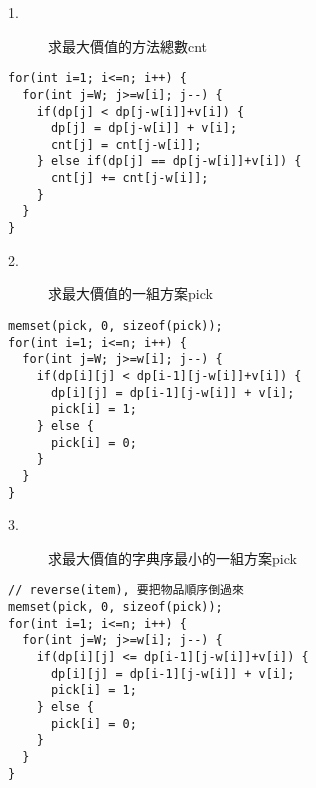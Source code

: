 \begin{center}
  \underline{  \bf{}  }
\end{center}

\begin{description}
  \item[1.] 求最大價值的方法總數cnt
\end{description}
\begin{lstlisting}
for(int i=1; i<=n; i++) {
  for(int j=W; j>=w[i]; j--) {
    if(dp[j] < dp[j-w[i]]+v[i]) {
      dp[j] = dp[j-w[i]] + v[i];
      cnt[j] = cnt[j-w[i]];
    } else if(dp[j] == dp[j-w[i]]+v[i]) {
      cnt[j] += cnt[j-w[i]];
    }
  }
}
\end{lstlisting}

\begin{description}
  \item[2.] 求最大價值的一組方案pick
\end{description}
\begin{lstlisting}
memset(pick, 0, sizeof(pick));
for(int i=1; i<=n; i++) {
  for(int j=W; j>=w[i]; j--) {
    if(dp[i][j] < dp[i-1][j-w[i]]+v[i]) {
      dp[i][j] = dp[i-1][j-w[i]] + v[i];
      pick[i] = 1;
    } else {
      pick[i] = 0;
    }
  }
}
\end{lstlisting}

\begin{description}
  \item[3.] 求最大價值的字典序最小的一組方案pick
\end{description}
\begin{lstlisting}
// reverse(item), 要把物品順序倒過來
memset(pick, 0, sizeof(pick));
for(int i=1; i<=n; i++) {
  for(int j=W; j>=w[i]; j--) {
    if(dp[i][j] <= dp[i-1][j-w[i]]+v[i]) {
      dp[i][j] = dp[i-1][j-w[i]] + v[i];
      pick[i] = 1;
    } else {
      pick[i] = 0;
    }
  }
}
\end{lstlisting}